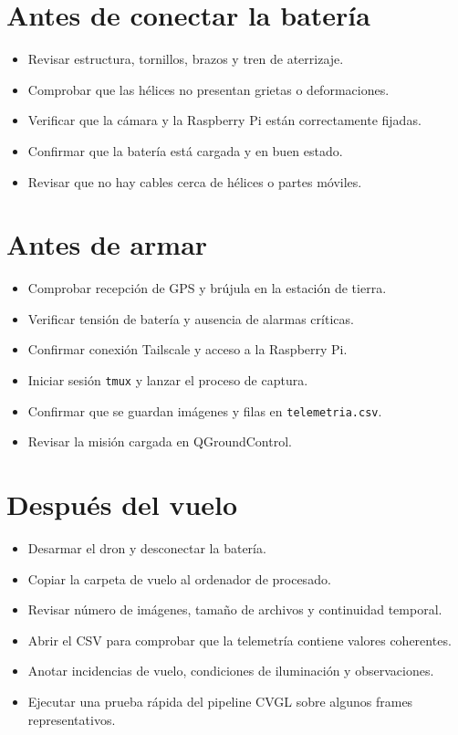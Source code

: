 \section{Antes de conectar la batería}
\label{sec:checklist-antes-bateria}

\begin{itemize}
\item Revisar estructura, tornillos, brazos y tren de aterrizaje.
\item Comprobar que las hélices no presentan grietas o deformaciones.
\item Verificar que la cámara y la Raspberry Pi están correctamente fijadas.
\item Confirmar que la batería está cargada y en buen estado.
\item Revisar que no hay cables cerca de hélices o partes móviles.
\end{itemize}

\section{Antes de armar}
\label{sec:checklist-antes-armar}

\begin{itemize}
\item Comprobar recepción de GPS y brújula en la estación de tierra.
\item Verificar tensión de batería y ausencia de alarmas críticas.
\item Confirmar conexión Tailscale y acceso a la Raspberry Pi.
\item Iniciar sesión \texttt{tmux} y lanzar el proceso de captura.
\item Confirmar que se guardan imágenes y filas en \texttt{telemetria.csv}.
\item Revisar la misión cargada en QGroundControl.
\end{itemize}

\section{Después del vuelo}
\label{sec:checklist-despues-vuelo}

\begin{itemize}
\item Desarmar el dron y desconectar la batería.
\item Copiar la carpeta de vuelo al ordenador de procesado.
\item Revisar número de imágenes, tamaño de archivos y continuidad temporal.
\item Abrir el CSV para comprobar que la telemetría contiene valores coherentes.
\item Anotar incidencias de vuelo, condiciones de iluminación y observaciones.
\item Ejecutar una prueba rápida del pipeline CVGL sobre algunos frames representativos.
\end{itemize}

